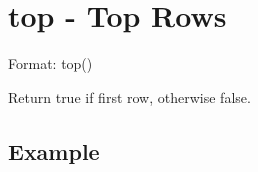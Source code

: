 %

\section{top - Top Rows\label{sect:top}}

Format: top()

Return true if first row, otherwise false. 

\subsection*{Example}


%

